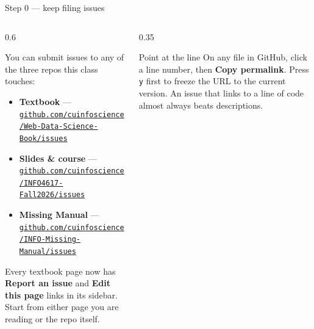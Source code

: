 \documentclass[9pt,aspectratio=169]{beamer}
\begin{document}
\begin{frame}{Step 0 --- keep filing issues}
    \begin{columns}[T]
        \begin{column}{0.6\textwidth}

            You can submit issues to any of the three repos this class touches:
            {\footnotesize
            \begin{itemize}\footnotesize
                \item \textbf{Textbook} --- \href{https://github.com/cuinfoscience/Web-Data-Science-Book/issues}{\texttt{github.com/cuinfoscience/Web-Data-Science-Book/issues}}
                \item \textbf{Slides \& course} --- \href{https://github.com/cuinfoscience/INFO4617-Fall2026/issues}{\texttt{github.com/cuinfoscience/INFO4617-Fall2026/issues}}
                \item \textbf{Missing Manual} --- \href{https://github.com/cuinfoscience/INFO-Missing-Manual/issues}{\texttt{github.com/cuinfoscience/INFO-Missing-Manual/issues}}
            \end{itemize}}

            \medskip

            Every textbook page now has \textbf{Report an issue} and \textbf{Edit this page} links in its sidebar. Start from either page you are reading or the repo itself.
        \end{column}
        \begin{column}{0.35\textwidth}
            \begin{alertblock}{Point at the line}
                \small On any file in GitHub, click a line number, then \textbf{Copy permalink}. Press \texttt{y} first to freeze the URL to the current version. An issue that links to a line of code almost always beats descriptions.
            \end{alertblock}
        \end{column}
    \end{columns}
\end{frame}
\end{document}
